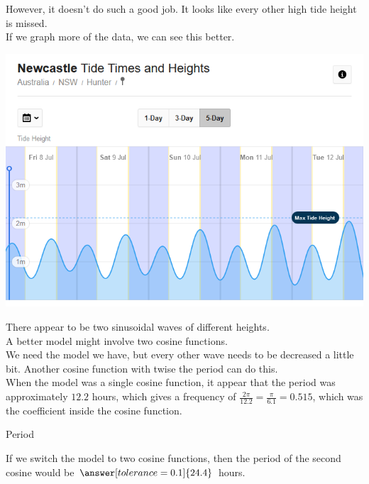\documentclass{ximera}
\begin{document}
However, it doesn't do such a good job. It looks like every other high tide height is missed.\\


If we graph more of the data, we can see this better.





\begin{image}
\includegraphics{pics/tides2.png}
\end{image}



There appear to be two sinusoidal waves of different heights.  \\

A better model might involve two cosine functions. \\


We need the model we have, but every other wave needs to be decreased a little bit.  Another cosine function with twise the period can do this. \\



When the model was a single cosine function, it appear that the period was approximately $12.2$ hours, which gives a frequency of $\frac{2 \pi}{12.2} = \frac{\pi}{6.1} = 0.515$, which was the coefficient inside the cosine function.  



\begin{question}  Period

If we switch the model to two cosine functions, then the period of the second cosine would be $\answer[tolerance=0.1]{24.4}$ hours.


\end{question}
\end{document}
